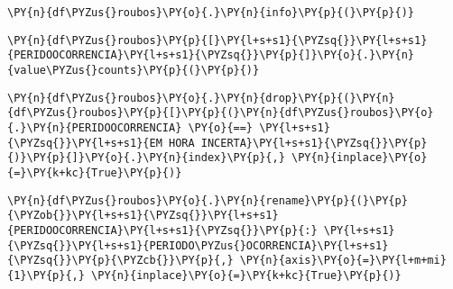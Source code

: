     \begin{tcolorbox}[breakable, size=fbox, boxrule=1pt, pad at break*=1mm,colback=cellbackground, colframe=cellborder]
\begin{Verbatim}[commandchars=\\\{\}]
\PY{n}{df\PYZus{}roubos}\PY{o}{.}\PY{n}{info}\PY{p}{(}\PY{p}{)}
\end{Verbatim}
\end{tcolorbox}

    \begin{tcolorbox}[breakable, size=fbox, boxrule=1pt, pad at break*=1mm,colback=cellbackground, colframe=cellborder]
\begin{Verbatim}[commandchars=\\\{\}]
\PY{n}{df\PYZus{}roubos}\PY{p}{[}\PY{l+s+s1}{\PYZsq{}}\PY{l+s+s1}{PERIDOOCORRENCIA}\PY{l+s+s1}{\PYZsq{}}\PY{p}{]}\PY{o}{.}\PY{n}{value\PYZus{}counts}\PY{p}{(}\PY{p}{)}
\end{Verbatim}
\end{tcolorbox}

    \begin{tcolorbox}[breakable, size=fbox, boxrule=1pt, pad at break*=1mm,colback=cellbackground, colframe=cellborder]
\begin{Verbatim}[commandchars=\\\{\}]
\PY{n}{df\PYZus{}roubos}\PY{o}{.}\PY{n}{drop}\PY{p}{(}\PY{n}{df\PYZus{}roubos}\PY{p}{[}\PY{p}{(}\PY{n}{df\PYZus{}roubos}\PY{o}{.}\PY{n}{PERIDOOCORRENCIA} \PY{o}{==} \PY{l+s+s1}{\PYZsq{}}\PY{l+s+s1}{EM HORA INCERTA}\PY{l+s+s1}{\PYZsq{}}\PY{p}{)}\PY{p}{]}\PY{o}{.}\PY{n}{index}\PY{p}{,} \PY{n}{inplace}\PY{o}{=}\PY{k+kc}{True}\PY{p}{)}
\end{Verbatim}
\end{tcolorbox}

    \begin{tcolorbox}[breakable, size=fbox, boxrule=1pt, pad at break*=1mm,colback=cellbackground, colframe=cellborder]
\begin{Verbatim}[commandchars=\\\{\}]
\PY{n}{df\PYZus{}roubos}\PY{o}{.}\PY{n}{rename}\PY{p}{(}\PY{p}{\PYZob{}}\PY{l+s+s1}{\PYZsq{}}\PY{l+s+s1}{PERIDOOCORRENCIA}\PY{l+s+s1}{\PYZsq{}}\PY{p}{:} \PY{l+s+s1}{\PYZsq{}}\PY{l+s+s1}{PERIODO\PYZus{}OCORRENCIA}\PY{l+s+s1}{\PYZsq{}}\PY{p}{\PYZcb{}}\PY{p}{,} \PY{n}{axis}\PY{o}{=}\PY{l+m+mi}{1}\PY{p}{,} \PY{n}{inplace}\PY{o}{=}\PY{k+kc}{True}\PY{p}{)}
\end{Verbatim}
\end{tcolorbox}

